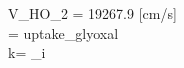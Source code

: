 V_{HO_2} = 19267.9     \;\;\; \mbox{[cm/s]}\\ 
\gamma = \mbox{uptake}_{\mbox{glyoxal}}     \\
\mbox{k}= \sum_i  
